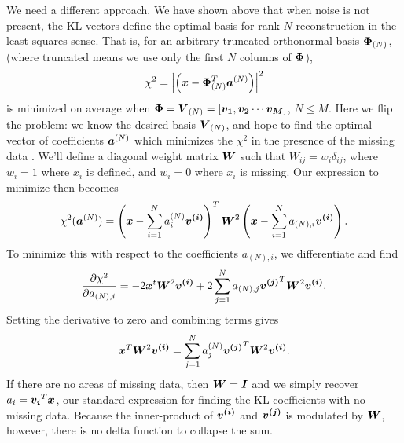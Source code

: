 We need a different approach.  We have shown above that when noise is
not present, the KL vectors define the optimal basis for rank-$N$
reconstruction in the least-squares sense.  That is, for an arbitrary
truncated orthonormal basis $\boldsymbol{\Phi}_{(N)}$, (where truncated means
we use only the first $N$ columns of $\boldsymbol{\Phi}$),
\begin{equation}
  \chi^2 = \left|\left(\boldsymbol{x}
  - \boldsymbol{\Phi}_{(N)}^T\boldsymbol{a}^{(N)}\right)\right|^2
\end{equation}
is minimized on average when
$\boldsymbol{\Phi} = \boldsymbol{V}_{(N)}
= [\boldsymbol{v_1}, \boldsymbol{v_2} \cdots \boldsymbol{v_M}]$, $N \le M$.
Here we flip the problem: we know the desired basis $\boldsymbol{V}_{(N)}$,
and hope to find the optimal vector of coefficients $\boldsymbol{a}^{(N)}$
which minimizes the $\chi^2$ in the presence of the missing data
\citep{Connolly99}.
We'll define a 
diagonal weight matrix $\boldsymbol{W}$ such that $W_{ij} = w_i\delta_{ij}$,
where $w_i=1$ where $x_i$ is defined, and $w_i=0$ where $x_i$ is
missing.  Our expression to minimize then becomes
\begin{equation}
  \chi^2(\boldsymbol{a}^{(N)}) = \left(\boldsymbol{x}
  - \sum_{i=1}^N a^{(N)}_i \boldsymbol{v^{(i)}}\right)^T
  \boldsymbol{W}^2 \left(\boldsymbol{x}
  - \sum_{i=1}^N a_{(N),i} \boldsymbol{v^{(i)}}\right).
\end{equation}
To minimize this with respect to the coefficients $a_{(N),i}$, we differentiate
and find
\begin{equation}
  \frac{\partial\chi^2}{\partial a_{(N),i}} = -2 \boldsymbol{x}^t\boldsymbol{W}^2\boldsymbol{v^{(i)}}
  + 2\sum_{j=1}^N a_{(N),j} \boldsymbol{v^{(j)}}^T \boldsymbol{W}^2 \boldsymbol{v^{(i)}}.
\end{equation}
Setting the derivative to zero and combining terms gives
\begin{equation}
  \label{eq:masked_coeff}
  \boldsymbol{x}^T\boldsymbol{W}^2\boldsymbol{v^{(i)}} =
  \sum_{j=1}^N a^{(N)}_j \boldsymbol{v^{(j)}}^T \boldsymbol{W}^2 \boldsymbol{v^{(i)}}.
\end{equation}
If there are no areas of missing data, then $\boldsymbol{W} = \boldsymbol{I}$ and we
simply recover $a_i = \boldsymbol{v_i}^T\boldsymbol{x}$, our standard expression
for finding the KL coefficients with no missing data.
Because the inner-product of
$\boldsymbol{v^{(i)}}$ and $\boldsymbol{v^{(j)}}$ is modulated by $\boldsymbol{W}$, however,
there is no delta function to collapse the sum.

